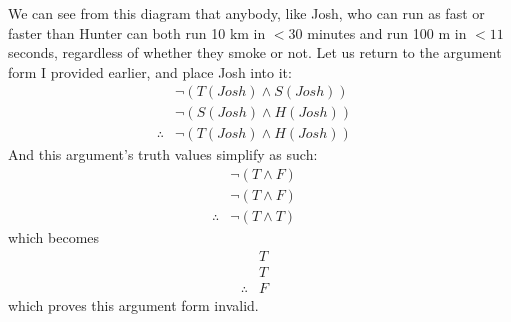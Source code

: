 \documentclass{article}
\begin{document}
We can see from this diagram that anybody, like Josh, who can run as fast or
faster than Hunter can both run 10 km in $<30$ minutes and run 100 m in $<11$
seconds, regardless of whether they smoke or not. Let us return to the argument
form I provided earlier, and place Josh into it:
\begin{align*}
               & \neg (T(Josh) \land S(Josh))  & \\
               & \neg (S(Josh) \land H(Josh))  & \\
    \therefore & \neg ( T(Josh) \land H(Josh)) &
\end{align*}
And this argument's truth values simplify as such:
\begin{align*}
               & \neg (T \land F)  & \\
               & \neg (T \land F)  & \\
    \therefore & \neg ( T \land T) &
\end{align*}
which becomes
\begin{align*}
               & T & \\
               & T & \\
    \therefore & F &
\end{align*}
which proves this argument form invalid.
\end{document}
